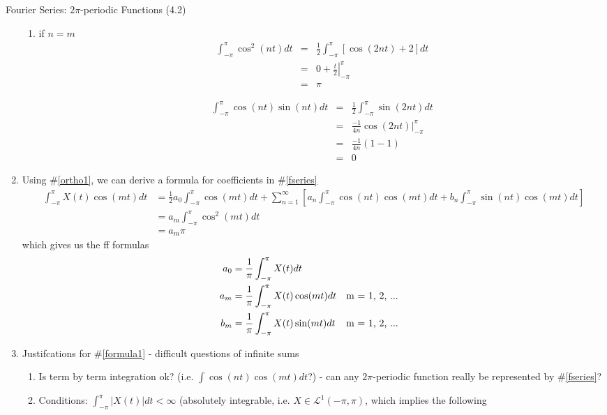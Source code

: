 \documentclass{article}
\newcommand{\intpi}{\int_{-\pi}^{\pi}}
\begin{document}
\begin{section}{Fourier Series: $2\pi$-periodic Functions (4.2)}
\begin{enumerate}
\begin{enumerate}
    \item if $n = m$
    \begin{eqnarray}
    \intpi \cos^{2}(nt) dt & = & \frac{1}{2} \intpi [\cos(2nt) + 2] dt 
                                                    \nonumber \\
    & = & 0 + \left. \frac{t}{2} \right|_{-\pi}^{\pi} \nonumber\\
    & = & \pi \nonumber
    \end{eqnarray}

    \begin{eqnarray}
    \intpi \cos(nt)\sin(nt) dt & = & \frac{1}{2} \intpi \sin(2nt) dt\nonumber\\
     & = & \frac{-1}{4n} \left. \cos(2nt) \right|_{-\pi}^{\pi} \nonumber\\
     & = & \frac{-1}{4n} (1 - 1) \nonumber\\
     & = & 0 \nonumber
    \end{eqnarray}

    \end{enumerate}
\item \label{formula1} Using \#\ref{ortho1}, we can derive a formula for 
  coefficients in \#\ref{fseries}
  \begin{align}
  \intpi X(t) \cos(mt) dt & = \frac{1}{2} a_{0} \intpi \cos(mt) dt +
      \sum_{n=1}^{\infty} [a_{n} \intpi \cos(nt)\cos(mt) dt + 
                           b_{n} \intpi \sin(nt)\cos(mt) dt ] \nonumber\\
   & = a_{m} \intpi \cos^{2}(mt) dt \nonumber\\
   & = a_{m} \pi \nonumber
  \end{align}
  \noindent which gives us the ff formulas
  \begin{align}
  a_{0} & =  \frac{1}{\pi} \intpi X(t) dt  \notag\\
  a_{m} & =  \frac{1}{\pi} \intpi X(t) \cos(mt) dt && \text{m = 1, 2, ...} \notag\\
  b_{m} & =  \frac{1}{\pi} \intpi X(t) \sin(mt) dt && \text{m = 1, 2, ...} \notag
  \end{align}

\item \label{justify} Justifcations for \#\ref{formula1} - difficult questions 
of infinite sums
  \begin{enumerate}
  \item Is term by term integration ok? (i.e. $\int \cos(nt)\cos(mt) dt$?) -
  can any $2\pi$-periodic function really be represented by \#\ref{fseries}?
  \item Conditions: $\intpi |X(t)| dt < \infty$ (absolutely integrable,
  i.e. $X \in \mathcal{L}^{1}(-\pi,\pi)$, which implies the following


\end{enumerate}
\end{enumerate}
\end{section}
\end{document}
